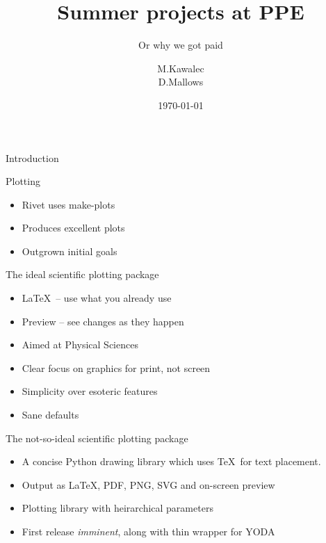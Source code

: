 \documentclass{beamer}
\title{Summer projects at PPE}
\subtitle{Or why we got paid}
\author{M.Kawalec \\ D.Mallows}
\date{\today}
\begin{document}
  \frame{\titlepage}



  \begin{frame}{Introduction}


  \end{frame}

  \begin{frame}{Plotting}
    \begin{itemize}[<uncover@+>]
      \item Rivet uses make-plots
      \item Produces excellent plots
      \item Outgrown initial goals
    \end{itemize}
  \end{frame}

  \begin{frame}{The ideal scientific plotting package}
    \begin{itemize}[<uncover@+>]
      \item \LaTeX\ -- use what you already use
      \item Preview -- see changes as they happen
      \item Aimed at Physical Sciences
      \item Clear focus on graphics for print, not screen
      \item Simplicity over esoteric features
      \item Sane defaults
    \end{itemize}
  \end{frame}

  \begin{frame}{The not-so-ideal scientific plotting package}
    \begin{itemize}[<uncover@+>]
      \item A concise Python drawing library which uses \TeX\ for text placement.
      \item Output as \LaTeX, PDF, PNG, SVG and on-screen preview
      \item Plotting library with heirarchical parameters
      \item First release {\em imminent}, along with thin wrapper for YODA
    \end{itemize}
  \end{frame}
\end{document}
